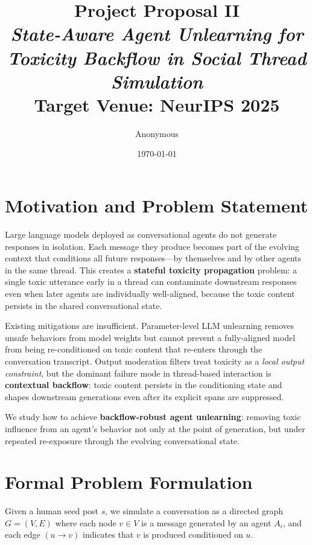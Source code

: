 \documentclass[11pt]{article}
\title{\textbf{Project Proposal II}\\[0.4em]
\large\textit{State-Aware Agent Unlearning for Toxicity Backflow in Social Thread Simulation}\\[0.3em]
\normalsize Target Venue: NeurIPS 2025}
\author{Anonymous}
\date{\today}
\begin{document}
\maketitle

\section{Motivation and Problem Statement}

Large language models deployed as conversational agents do not generate responses in
isolation. Each message they produce becomes part of the evolving context that conditions
all future responses---by themselves and by other agents in the same thread. This creates
a \textbf{stateful toxicity propagation} problem: a single toxic utterance early in a
thread can contaminate downstream responses even when later agents are individually
well-aligned, because the toxic content persists in the shared conversational state.

Existing mitigations are insufficient. Parameter-level LLM unlearning removes unsafe
behaviors from model weights but cannot prevent a fully-aligned model from being
re-conditioned on toxic content that re-enters through the conversation transcript.
Output moderation filters treat toxicity as a \emph{local output constraint}, but the
dominant failure mode in thread-based interaction is \textbf{contextual backflow}: toxic
content persists in the conditioning state and shapes downstream generations even after
its explicit spans are suppressed.

We study how to achieve \textbf{backflow-robust agent unlearning}: removing toxic
influence from an agent's behavior not only at the point of generation, but under
repeated re-exposure through the evolving conversational state.

\section{Formal Problem Formulation}

Given a human seed post $s$, we simulate a conversation as a directed graph $G=(V,E)$
where each node $v \in V$ is a message generated by an agent $A_i$, and each edge
$(u \to v)$ indicates that $v$ is produced conditioned on $u$.
\end{document}
